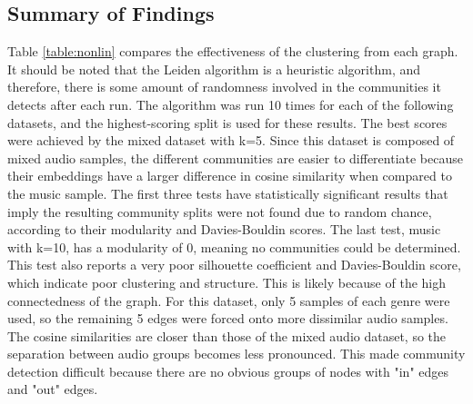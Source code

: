 \documentclass{article}
\begin{document}
\subsection{Summary of Findings}
Table \ref{table:nonlin} compares the effectiveness of the clustering from each graph. It should be noted that the Leiden algorithm is a heuristic algorithm, and therefore, there is some amount of randomness involved in the communities it detects after each run. The algorithm was run 10 times for each of the following datasets, and the highest-scoring split is used for these results. The best scores were achieved by the mixed dataset with k=5. Since this dataset is composed of mixed audio samples, the different communities are easier to differentiate because their embeddings have a larger difference in cosine similarity when compared to the music sample.
The first three tests have statistically significant results that imply the resulting community splits were not found due to random chance, according to their modularity and Davies-Bouldin scores. The last test, music with k=10, has a modularity of 0, meaning no communities could be determined. This test also reports a very poor silhouette coefficient and Davies-Bouldin score, which indicate poor clustering and structure. This is likely because of the high connectedness of the graph. For this dataset, only 5 samples of each genre were used, so the remaining 5 edges were forced onto more dissimilar audio samples. The cosine similarities are closer than those of the mixed audio dataset, so the separation between audio groups becomes less pronounced. This made community detection difficult because there are no obvious groups of nodes with "in" edges and "out" edges. 

\begin{table}[ht]
\caption{Clustering Effectiveness per Graph} %
\label{table:nonlin} %
\centering %
\end{table}
\end{document}
